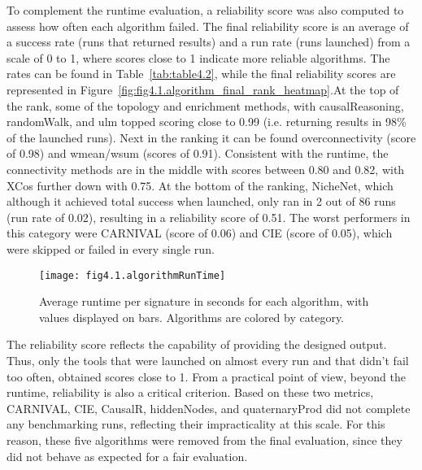 To complement the runtime evaluation, a reliability score was also computed to assess how often each algorithm failed. The final reliability score is an average of a success rate (runs that returned results) and a run rate (runs launched) from a scale of 0 to 1, where scores close to 1 indicate more reliable algorithms. The rates can be found in Table~\ref{tab:table4.2}, while the final reliability scores are represented in Figure~\ref{fig:fig4.1.algorithm_final_rank_heatmap}.At the top of the rank, some of the topology and enrichment methods, with  causalReasoning, randomWalk, and ulm topped scoring close to 0.99 (i.e. returning results in 98\% of the launched runs). Next in the ranking it can be found overconnectivity (score of 0.98) and wmean/wsum (scores of 0.91). Consistent with the runtime, the connectivity methods are in the middle with scores between 0.80 and 0.82, with XCos further down with 0.75. At the bottom of the ranking, NicheNet, which although it achieved total success when launched, only ran in 2 out of 86 runs (run rate of 0.02), resulting in a reliability score of 0.51. The worst performers in this category were CARNIVAL (score of 0.06) and CIE (score of 0.05), which were skipped or failed in every single run. 

\begin{figure}[htbp]
    \centering
    \texttt{[image: fig4.1.algorithmRunTime]}
    \caption[Runtime per signtures.]{Average runtime per signature in seconds for each algorithm, with values displayed on bars. Algorithms are colored by category.}
    \label{fig:fig4.1.algorithmRunTime}
\end{figure}

The reliability score reflects the capability of providing the designed output. Thus, only the tools that were launched on almost every run and that didn't fail too often, obtained scores close to 1. From a practical point of view, beyond the runtime, reliability is also a critical criterion. Based on these two metrics, CARNIVAL, CIE, CausalR, hiddenNodes, and quaternaryProd did not complete any benchmarking runs, reflecting their impracticality at this scale. For this reason, these five algorithms were removed from the final evaluation, since they did not behave as expected for a fair evaluation. 

